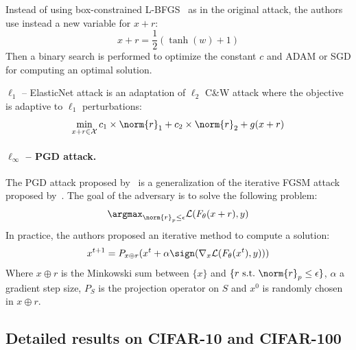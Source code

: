 Instead of using box-constrained L-BFGS~\cite{szegedy2013intriguing} as in the original attack, the authors use instead a new variable for $x+r$:
\begin{equation}
  x+r=\frac{1}{2} (\tanh(w)+1)
\end{equation}
\medbreak
Then a binary search is performed to optimize the constant $c$ and ADAM or SGD for computing an optimal solution.

$\ell_1$ -- ElasticNet attack is an adaptation of $\ell_2$ C\&W attack where the objective is adaptive to $\ell_1$ perturbations:
\begin{equation}
  \min_{x+r\in \mathcal{X} } c_1\times\norm{r}_1+c_2\times\norm{r}_2+g(x+r)
\end{equation}


\paragraph{$\ell_\infty$ -- PGD attack.}
The PGD attack proposed by~\citet{madry2018towards} is a generalization of the iterative FGSM attack proposed by~\citet{kurakin2016adversarial}. The goal of the adversary is to solve the following problem:
$$\argmax_{\norm{r}_p \leq \epsilon} \mathcal{L}(F_{\theta}(x+r),y) $$
In practice, the authors proposed an iterative method to compute a solution:
$$x^{t+1}=P_{x \oplus r}(x^t+\alpha \sign (\nabla_x\mathcal{L}(F_\theta(x^t),y)))$$
Where $x \oplus r$ is the Minkowski sum between $\{x\}$ and $\{r \text{~s.t.~} \norm{r}_p \leq \epsilon\}$, $\alpha$ a gradient step size, $P_S$ is the projection operator on $S$ and $x^0$ is randomly chosen in $x \oplus r$. 

\subsection{Detailed results on CIFAR-10 and CIFAR-100}

